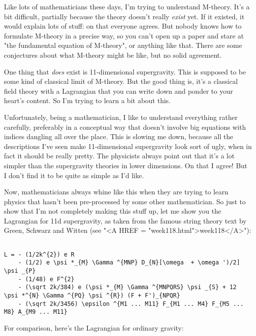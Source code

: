 

Like lots of mathematicians these days, I'm trying to understand
M-theory.  It's a bit difficult, partially because the theory doesn't
really \emph{exist} yet.  If it existed, it would explain lots of stuff: on
that everyone agrees.  But nobody knows how to formulate M-theory in a
precise way, so you can't open up a paper and stare at "the fundamental
equation of M-theory", or anything like that.  There are some conjectures 
about what M-theory might be like, but no solid agreement.

One thing that \emph{does} exist is 11-dimensional supergravity.  This is 
supposed to be some kind of classical limit of M-theory.  But the good 
thing is, it's a classical field theory with a Lagrangian that you can 
write down and ponder to your heart's content.  So I'm trying to learn a 
bit about this. 
 
Unfortunately, being a mathematician, I like to understand everything 
rather carefully, preferably in a conceptual way that doesn't involve 
big equations with indices dangling all over the place.  This is slowing  
me down, because all the descriptions I've seen make 11-dimensional 
supergravity look sort of ugly, when in fact it should be really pretty. 
The physicists always point out that it's a lot simpler than the 
supergravity theories in lower dimensions.  On that I agree!  But I  
don't find it to be quite as simple as I'd like.   
 
Now, mathematicians always whine like this when they are trying to learn
physics that hasn't been pre-processed by some other mathematician.  So
just to show that I'm not completely making this stuff up, let me show
you the Lagrangian for 11d supergravity, as taken from the famous string
theory text by Green, Schwarz and Witten (see "<A HREF =
"week118.html">week118</A>"):
 

\begin{verbatim}

L = - (1/2k^{2}) e R  
    - (1/2) e \psi *_{M} \Gamma ^{MNP} D_{N}[\omega  + \omega ')/2] \psi _{P} 
    - (1/48) e F^{2}
    - (\sqrt 2k/384) e (\psi *_{M} \Gamma ^{MNPQRS} \psi _{S} + 12 \psi *^{N} \Gamma ^{PQ} \psi ^{R}) (F + F')_{NPQR} 
    - (\sqrt 2k/3456) \epsilon ^{M1 ... M11} F_{M1 ... M4} F_{M5 ... M8} A_{M9 ... M11}
\end{verbatim}
    
For comparison, here's the Lagrangian for ordinary gravity: 
 

